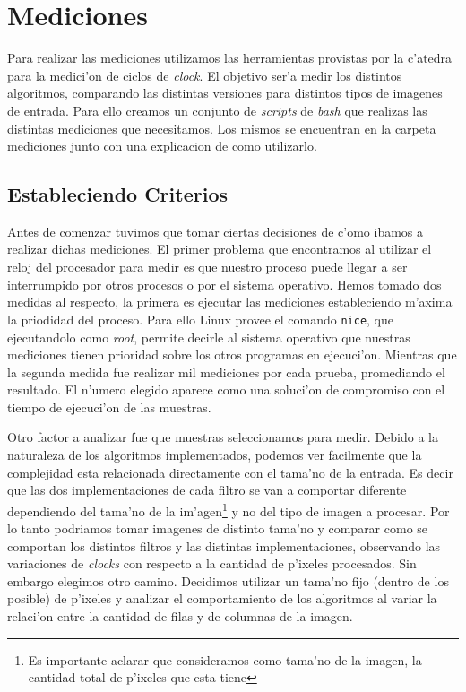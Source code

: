 \section{Mediciones}
Para realizar las mediciones utilizamos las herramientas provistas por la c'atedra para la medici'on de ciclos de \textit{clock}. El objetivo ser'a medir los distintos algoritmos, comparando las distintas versiones para distintos tipos de imagenes de entrada. Para ello creamos un conjunto de \textit{scripts} de \textit{bash} que realizas las distintas mediciones que necesitamos. Los mismos se encuentran en la carpeta mediciones junto con una explicacion de como utilizarlo.

\subsection{Estableciendo Criterios}

Antes de comenzar tuvimos que tomar ciertas decisiones de c'omo ibamos a realizar dichas mediciones. El primer problema que encontramos al utilizar el reloj del procesador para medir es que nuestro proceso puede llegar a ser interrumpido por otros procesos o por el sistema operativo. Hemos tomado dos medidas al respecto, la primera es ejecutar las mediciones estableciendo m'axima la priodidad del proceso. Para ello Linux provee el comando \texttt{nice}, que ejecutandolo como \textit{root}, permite decirle al sistema operativo que nuestras mediciones tienen prioridad sobre los otros programas en ejecuci'on. 
Mientras que la segunda medida fue realizar mil mediciones por cada prueba, promediando el resultado. El n'umero elegido aparece como una soluci'on de compromiso con el tiempo de ejecuci'on de las muestras.

Otro factor a analizar fue que muestras seleccionamos para medir. Debido a la naturaleza de los algoritmos implementados, podemos ver facilmente que la complejidad esta relacionada directamente con el tama'no de la entrada. Es decir que las dos implementaciones de cada filtro se van a comportar diferente dependiendo del tama'no de la im'agen\footnote{Es importante aclarar que consideramos como tama'no de la imagen, la cantidad total de p'ixeles que esta tiene} y no del tipo de imagen a procesar. Por lo tanto podriamos tomar imagenes de distinto tama'no y comparar como se comportan los distintos filtros y las distintas implementaciones, observando las variaciones de \textit{clocks} con respecto a la cantidad de p'ixeles procesados. Sin embargo elegimos otro camino. Decidimos utilizar un tama'no fijo (dentro de los posible) de p'ixeles y analizar el comportamiento de los algoritmos al variar la relaci'on entre la cantidad de filas y de columnas de la imagen. 


